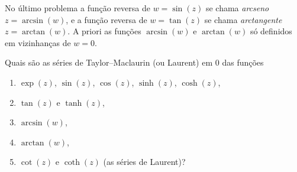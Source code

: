 \begin{defin}
No último problema a função reversa de $w=\sin(z)$ se chama \emph{arcseno} $z = \arcsin(w)$,
e a função reversa de $w=\tan(z)$ se chama \emph{arctangente} $z = \arctan(w)$.
A priori as funções $\arcsin(w)$ e $\arctan(w)$ só definidos em vizinhanças de $w=0$.
\end{defin}

\begin{problema}
Quais são as séries de Taylor--Maclaurin (ou Laurent) em $0$ das funções
\begin{enumerate}
\item $\exp(z)$, $\sin(z)$, $\cos(z)$, $\sinh(z)$, $\cosh(z)$,
\item $\tan(z)$ e $\tanh(z)$,
\item $\arcsin(w)$,
\item $\arctan(w)$,
\item $\cot(z)$ e $\coth(z)$ (as séries de Laurent)?
\end{enumerate}
\end{problema}

